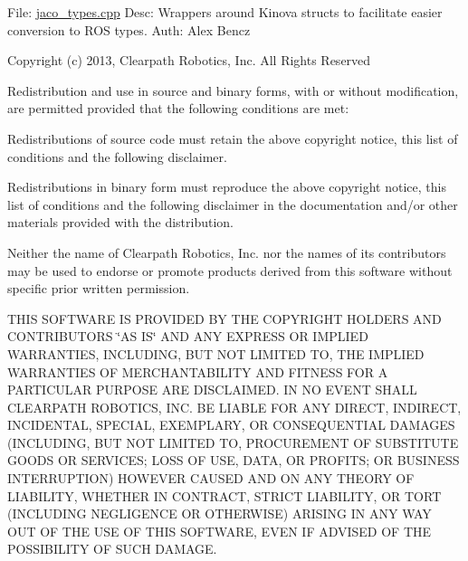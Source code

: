File\+: \hyperlink{jaco__types_8cpp}{jaco\+\_\+types.\+cpp} Desc\+: Wrappers around Kinova structs to facilitate easier conversion to R\+OS types. Auth\+: Alex Bencz

Copyright (c) 2013, Clearpath Robotics, Inc. All Rights Reserved

Redistribution and use in source and binary forms, with or without modification, are permitted provided that the following conditions are met\+:
\begin{DoxyItemize}
\item Redistributions of source code must retain the above copyright notice, this list of conditions and the following disclaimer.
\item Redistributions in binary form must reproduce the above copyright notice, this list of conditions and the following disclaimer in the documentation and/or other materials provided with the distribution.
\item Neither the name of Clearpath Robotics, Inc. nor the names of its contributors may be used to endorse or promote products derived from this software without specific prior written permission.
\end{DoxyItemize}

T\+H\+IS S\+O\+F\+T\+W\+A\+RE IS P\+R\+O\+V\+I\+D\+ED BY T\+HE C\+O\+P\+Y\+R\+I\+G\+HT H\+O\+L\+D\+E\+RS A\+ND C\+O\+N\+T\+R\+I\+B\+U\+T\+O\+RS \char`\"{}\+A\+S I\+S\char`\"{} A\+ND A\+NY E\+X\+P\+R\+E\+SS OR I\+M\+P\+L\+I\+ED W\+A\+R\+R\+A\+N\+T\+I\+ES, I\+N\+C\+L\+U\+D\+I\+NG, B\+UT N\+OT L\+I\+M\+I\+T\+ED TO, T\+HE I\+M\+P\+L\+I\+ED W\+A\+R\+R\+A\+N\+T\+I\+ES OF M\+E\+R\+C\+H\+A\+N\+T\+A\+B\+I\+L\+I\+TY A\+ND F\+I\+T\+N\+E\+SS F\+OR A P\+A\+R\+T\+I\+C\+U\+L\+AR P\+U\+R\+P\+O\+SE A\+RE D\+I\+S\+C\+L\+A\+I\+M\+ED. IN NO E\+V\+E\+NT S\+H\+A\+LL C\+L\+E\+A\+R\+P\+A\+TH R\+O\+B\+O\+T\+I\+CS, I\+NC. BE L\+I\+A\+B\+LE F\+OR A\+NY D\+I\+R\+E\+CT, I\+N\+D\+I\+R\+E\+CT, I\+N\+C\+I\+D\+E\+N\+T\+AL, S\+P\+E\+C\+I\+AL, E\+X\+E\+M\+P\+L\+A\+RY, OR C\+O\+N\+S\+E\+Q\+U\+E\+N\+T\+I\+AL D\+A\+M\+A\+G\+ES (I\+N\+C\+L\+U\+D\+I\+NG, B\+UT N\+OT L\+I\+M\+I\+T\+ED TO, P\+R\+O\+C\+U\+R\+E\+M\+E\+NT OF S\+U\+B\+S\+T\+I\+T\+U\+TE G\+O\+O\+DS OR S\+E\+R\+V\+I\+C\+ES; L\+O\+SS OF U\+SE, D\+A\+TA, OR P\+R\+O\+F\+I\+TS; OR B\+U\+S\+I\+N\+E\+SS I\+N\+T\+E\+R\+R\+U\+P\+T\+I\+ON) H\+O\+W\+E\+V\+ER C\+A\+U\+S\+ED A\+ND ON A\+NY T\+H\+E\+O\+RY OF L\+I\+A\+B\+I\+L\+I\+TY, W\+H\+E\+T\+H\+ER IN C\+O\+N\+T\+R\+A\+CT, S\+T\+R\+I\+CT L\+I\+A\+B\+I\+L\+I\+TY, OR T\+O\+RT (I\+N\+C\+L\+U\+D\+I\+NG N\+E\+G\+L\+I\+G\+E\+N\+CE OR O\+T\+H\+E\+R\+W\+I\+SE) A\+R\+I\+S\+I\+NG IN A\+NY W\+AY O\+UT OF T\+HE U\+SE OF T\+H\+IS S\+O\+F\+T\+W\+A\+RE, E\+V\+EN IF A\+D\+V\+I\+S\+ED OF T\+HE P\+O\+S\+S\+I\+B\+I\+L\+I\+TY OF S\+U\+CH D\+A\+M\+A\+GE.

